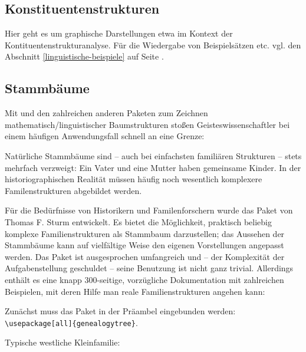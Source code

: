 \subsection{Konstituentenstrukturen}
\label{linguistische-strukturen}
   
 


Hier geht es um graphische Darstellungen etwa im Kontext der Kontituentenstrukturanalyse.
Für die Wiedergabe von Beispielsätzen etc. vgl. den Abschnitt 
\ref{linguistische-beispiele} auf Seite \pageref{linguistische-beispiele}.






\subsection{Stammbäume}
 

Mit  und den zahlreichen anderen Paketen zum Zeichnen mathematisch/linguistischer
Baumstrukturen stoßen Geisteswissenschaftler bei einem häufigen Anwendungsfall schnell an eine
Grenze:

Natürliche Stammbäume sind -- auch bei einfachsten familiären Strukturen -- stets mehrfach
verzweigt: Ein Vater und eine Mutter haben gemeinsame Kinder. 
In der historiographischen Realität müssen häufig noch wesentlich komplexere Familenstrukturen
abgebildet werden.

Für die Bedürfnisse von Historikern und Familenforschern wurde das Paket 
von Thomas F. Sturm entwickelt.
Es bietet die Möglichkeit, praktisch beliebig komplexe Familienstrukturen als Stammbaum darzustellen;
das Aussehen der Stammbäume kann auf vielfältige Weise den eigenen Vorstellungen angepasst werden.
Das Paket ist ausgesprochen umfangreich und -- der Komplexität der Aufgabenstellung geschuldet --
seine Benutzung ist nicht ganz trivial.
Allerdings enthält es eine knapp 300-seitige, vorzügliche Dokumentation mit zahlreichen Beispielen,
mit deren Hilfe man reale Familienstrukturen  angehen kann:

Zunächst muss das Paket in der Präambel eingebunden werden:
\lstinline/\usepackage[all]{genealogytree}/.

Typische westliche Kleinfamilie:

\begin{lfgwexample}{}
\end{lfgwexample}



